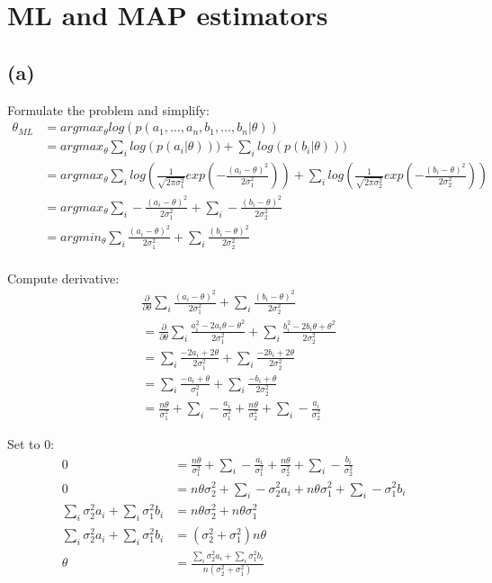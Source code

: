 \documentclass[a4paper]{scrartcl}
\begin{document}
\section*{ML and MAP estimators}
  \subsection*{(a)}
    Formulate the problem and simplify:
    \begin{align*}
      \theta_{ML} 
      &= argmax_\theta log(p(a_1, \dots , a_n, b_1, \dots , b_n \vert \theta))\\
      &= argmax_\theta \sum_i log(p(a_i \vert \theta))) + \sum_i log(p(b_i \vert \theta )))\\
      &= argmax_\theta \sum_i log(\frac{1}{\sqrt{2\pi \sigma_1^2}} exp(-\frac{(a_i - \theta )^2}{2\sigma_1^2})) + \sum_i log(\frac{1}{\sqrt{2\pi \sigma_2^2}} exp(-\frac{(b_i - \theta )^2}{2\sigma_2^2})) \\
      &= argmax_\theta \sum_i -\frac{(a_i - \theta )^2}{2\sigma_1^2} + \sum_i-\frac{(b_i - \theta )^2}{2\sigma_2^2} \\
      &= argmin_\theta \sum_i \frac{(a_i - \theta )^2}{2\sigma_1^2} + \sum_i\frac{(b_i - \theta )^2}{2\sigma_2^2} \\
    \end{align*}

    Compute derivative:
    \begin{align*}
      & \frac{\partial}{\partial \theta} \sum_i \frac{(a_i - \theta )^2}{2\sigma_1^2} + \sum_i \frac{(b_i - \theta )^2}{2\sigma_2^2}\\
      &= \frac{\partial}{\partial \theta} \sum_i \frac{a_i^2 - 2a_i \theta - \theta^2}{2\sigma_1^2} + \sum_i \frac{b_i^2 -2b_i \theta + \theta^2}{2\sigma_2^2}\\
      &= \sum_i \frac{-2a_i + 2\theta}{2\sigma_1^2} + \sum_i \frac{-2b_i  + 2\theta}{2\sigma_2^2}\\
      &= \sum_i \frac{-a_i + \theta}{\sigma_1^2} + \sum_i \frac{-b_i  + \theta}{2\sigma_2^2}\\
      &= \frac{n \theta }{\sigma_1^2} + \sum_i - \frac{a_i}{\sigma_1^2} + \frac{n \theta }{\sigma_2^2} + \sum_i - \frac{a_i}{\sigma_2^2}
    \end{align*}

    Set to 0:
    \begin{align*}
      0 &= \frac{n \theta }{\sigma_1^2} + \sum_i - \frac{a_i}{\sigma_1^2} + \frac{n \theta }{\sigma_2^2} + \sum_i - \frac{b_i}{\sigma_2^2}\\
      0 &= n\theta \sigma_2^2 + \sum_i - \sigma_2^2 a_i + n\theta \sigma_1^2 + \sum_i - \sigma_1^2 b_i\\
      \sum_i \sigma_2^2 a_i + \sum_i \sigma_1^2 b_i &= n\theta \sigma_2^2  + n\theta \sigma_1^2\\
      \sum_i \sigma_2^2 a_i + \sum_i \sigma_1^2 b_i &= (\sigma_2^2 + \sigma_1^2) n\theta\\
      \theta &= \frac{\sum_i \sigma_2^2 a_i + \sum_i \sigma_1^2 b_i}{n(\sigma_2^2 + \sigma_1^2)} \\
    \end{align*}
\end{document}
